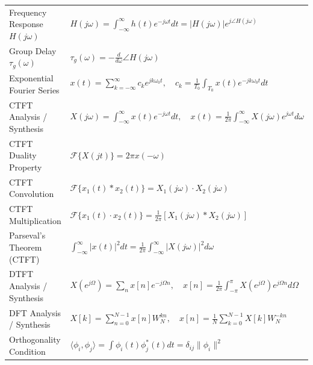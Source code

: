 \documentclass[12pt,a4paper]{article}
\renewcommand{\arraystretch}{1.45}
\begin{document}
\begin{tcolorbox}[formulabox, title={\textbf{Key Formulas at a Glance}}]
\renewcommand{\arraystretch}{1.35}
\begin{tabularx}{\linewidth}{B{5.0cm} X}
Frequency Response $H(j\omega)$ & $H(j\omega) = \int_{-\infty}^{\infty} h(t) e^{-j\omega t} dt = |H(j\omega)| e^{j\angle H(j\omega)}$ \\[4pt]
Group Delay $\tau_g(\omega)$ & $\tau_g(\omega) = -\frac{d}{d\omega} \angle H(j\omega)$ \\[4pt]
Exponential Fourier Series & $x(t) = \sum_{k=-\infty}^\infty c_k e^{j k \omega_0 t}, \quad c_k = \frac{1}{T_0} \int_{T_0} x(t) e^{-j k \omega_0 t} dt$ \\[4pt]
CTFT Analysis / Synthesis & $X(j\omega) = \int_{-\infty}^\infty x(t) e^{-j\omega t} dt, \quad x(t) = \frac{1}{2\pi}\int_{-\infty}^\infty X(j\omega) e^{j\omega t} d\omega$ \\[4pt]
CTFT Duality Property & $\mathcal{F}\{X(jt)\} = 2\pi x(-\omega)$ \\[4pt]
CTFT Convolution & $\mathcal{F}\{x_1(t) * x_2(t)\} = X_1(j\omega) \cdot X_2(j\omega)$ \\[4pt]
CTFT Multiplication & $\mathcal{F}\{x_1(t) \cdot x_2(t)\} = \frac{1}{2\pi} [X_1(j\omega) * X_2(j\omega)]$ \\[4pt]
Parseval's Theorem (CTFT) & $\int_{-\infty}^\infty |x(t)|^2 dt = \frac{1}{2\pi} \int_{-\infty}^\infty |X(j\omega)|^2 d\omega$ \\[4pt]
DTFT Analysis / Synthesis & $X(e^{j\Omega}) = \sum_n x[n] e^{-j\Omega n}, \quad x[n] = \frac{1}{2\pi}\int_{-\pi}^\pi X(e^{j\Omega}) e^{j\Omega n} d\Omega$ \\[4pt]
DFT Analysis / Synthesis & $X[k] = \sum_{n=0}^{N-1} x[n] W_N^{kn}, \quad x[n] = \frac{1}{N} \sum_{k=0}^{N-1} X[k] W_N^{-kn}$ \\[4pt]
Orthogonality Condition & $\langle \phi_i, \phi_j \rangle = \int \phi_i(t) \phi_j^*(t) dt = \delta_{ij} \|\phi_i\|^2$ \\[4pt]
\end{tabularx}
\end{tcolorbox}
\end{document}
